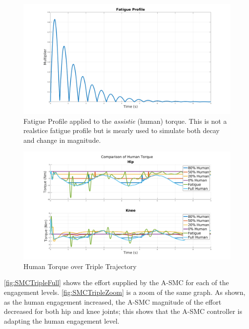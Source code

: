 \begin{figure}
    \centering
    \includegraphics[width=\columnwidth]{images/controllers/gait/fat_profile.png}
    \caption[Fatigue Profile]{Fatigue Profile applied to the \textit{assistie} (human) torque. This is not a realstice fatigue profile but is mearly used to simulate both decay and change in magnitude.}
    \label{fig:fatprofile}
\end{figure}


\begin{figure}
    \centering
    \includegraphics[width=\columnwidth]{images/controllers/trajs/human.png}
    \caption[Human Torque over Triple Trajectory]{Human Torque over Triple Trajectory}
    \label{fig:humantripletraj}
\end{figure}


\autoref{fig:SMCTripleFull} shows the effort supplied by the A-SMC for each of the engagement levels. \autoref{fig:SMCTripleZoom} is a zoom of the same graph. As shown, as the human engagement increased, the A-SMC magnitude of the effort decreased for both hip and knee joints; this shows that the A-SMC controller is adapting the human engagement level. 


